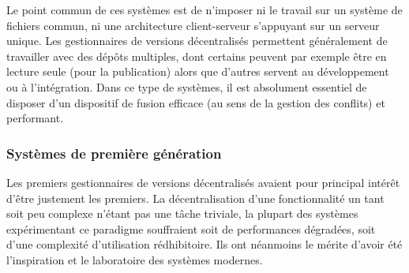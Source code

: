 Le point commun de ces systèmes est de n'imposer ni le travail sur un
système de fichiers commun, ni une architecture client-serveur
s'appuyant sur un serveur unique. Les gestionnaires de versions
décentralisés permettent généralement de travailler avec des dépôts
multiples, dont certains peuvent par exemple être en lecture seule
(pour la publication) alors que d'autres servent au développement ou à
l'intégration. Dans ce type de systèmes, il est absolument essentiel
de disposer d'un dispositif de fusion efficace (au sens de la gestion
des conflits) et performant.

\subsubsection{Systèmes de première génération}

Les premiers gestionnaires de versions décentralisés avaient pour
principal intérêt d'être justement les premiers. La décentralisation
d'une fonctionnalité un tant soit peu complexe n'étant pas une tâche
triviale, la plupart des systèmes expérimentant ce paradigme
souffraient soit de performances dégradées, soit d'une complexité
d'utilisation rédhibitoire. Ils ont néanmoins le mérite d'avoir été
l'inspiration et le laboratoire des systèmes modernes.

